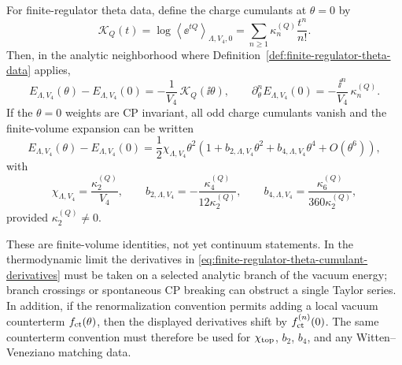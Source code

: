 \begin{proposition}
\label{prop:finite-regulator-theta-cumulant-hierarchy}
For finite-regulator theta data, define the charge cumulants at \(\theta=0\)
by
\begin{equation}
  \mathcal K_Q(t)
  =
  \log\left\langle \ee^{tQ}\right\rangle_{\Lambda,V_4,0}
  =
  \sum_{n\ge1}\kappa_n^{(Q)}\frac{t^n}{n!}.
  \label{eq:finite-regulator-charge-cumulant-generator}
\end{equation}
Then, in the analytic neighborhood where
Definition~\ref{def:finite-regulator-theta-data} applies,
\begin{equation}
  E_{\Lambda,V_4}(\theta)-E_{\Lambda,V_4}(0)
  =
  -\frac1{V_4}\,\mathcal K_Q(\ii\theta),
  \qquad
  \partial_\theta^n E_{\Lambda,V_4}(0)
  =
  -\frac{\ii^n}{V_4}\,\kappa_n^{(Q)} .
  \label{eq:finite-regulator-theta-cumulant-derivatives}
\end{equation}
If the \(\theta=0\) weights are CP invariant, all odd charge cumulants vanish
and the finite-volume expansion can be written
\begin{equation}
  E_{\Lambda,V_4}(\theta)-E_{\Lambda,V_4}(0)
  =
  \frac12\chi_{\Lambda,V_4}\theta^2
  \left(
    1+b_{2,\Lambda,V_4}\theta^2
     +b_{4,\Lambda,V_4}\theta^4+O(\theta^6)
  \right),
  \label{eq:finite-regulator-theta-even-expansion}
\end{equation}
with
\begin{equation}
  \chi_{\Lambda,V_4}
  =
  \frac{\kappa_2^{(Q)}}{V_4},\qquad
  b_{2,\Lambda,V_4}
  =
  -\frac{\kappa_4^{(Q)}}{12\kappa_2^{(Q)}},\qquad
  b_{4,\Lambda,V_4}
  =
  \frac{\kappa_6^{(Q)}}{360\kappa_2^{(Q)}} ,
  \label{eq:finite-regulator-theta-b2-b4-cumulants}
\end{equation}
provided \(\kappa_2^{(Q)}\neq0\).

These are finite-volume identities, not yet continuum statements.  In the
thermodynamic limit the derivatives in
\eqref{eq:finite-regulator-theta-cumulant-derivatives} must be taken on a
selected analytic branch of the vacuum energy; branch crossings or
spontaneous CP breaking can obstruct a single Taylor series.  In addition, if
the renormalization convention permits adding a local vacuum counterterm
\(f_{\rm ct}(\theta)\), then the displayed derivatives shift by
\(f_{\rm ct}^{(n)}(0)\).  The same counterterm convention must therefore be
used for \(\chi_{\rm top}\), \(b_2\), \(b_4\), and any Witten--Veneziano
matching data.
\end{proposition}

